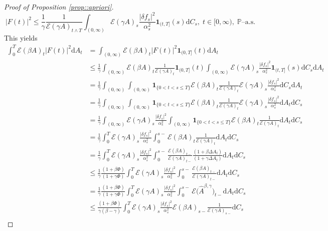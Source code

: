 \documentclass[10pt]{article} %
\newcommand\cE{\mathcal E}
\def \P{\mathbb{P}}
\newcommand{\1}{\mathbf{1}}
\def\d{\mathrm{d}}
\begin{document}
\begin{proof}[Proof of Proposition \ref{prop::apriori}]
\begin{equation}\label{eq::F_t_squared}
	|F(t)|^2 \leq \frac{1}{\gamma} \frac{1}{\cE(\gamma A)_{t \land T}} \int_{(0,\infty)} \cE(\gamma A)_s \frac{|\delta f_s|^2}{\alpha^2_s}  \mathbf{1}_{(t,T]}(s) \d C_s, \; t \in [0,\infty), \; \text{$\P$--a.s.}
\end{equation}
This yields
\begin{align*}
	\int_0^T \cE(\beta A)_t |F(t)|^2 \d A_t 
	&= \int_{(0,\infty)} \cE(\beta A)_t |F(t)|^2 \mathbf{1}_{(0,T]}(t) \d A_t \\ 
	&\leq \frac{1}{\gamma}\int_{(0,\infty)} \cE(\beta A)_{t}  \frac{1}{\cE(\gamma A)_{t}} \mathbf{1}_{(0,T]}(t) \int_{(0,\infty)} \cE(\gamma A)_s \frac{|\delta f_s|^2}{\alpha^2_s} \mathbf{1}_{(t,T]}(s) \d C_s \d A_t \nonumber\\
	&= \frac{1}{\gamma}\int_{(0,\infty)}\int_{(0,\infty)}\mathbf{1}_{\{0<t < s \leq T\}} \cE(\beta A)_{t}  \frac{1}{\cE(\gamma A)_{t}} \cE(\gamma A)_s \frac{|\delta f_s|^2}{\alpha^2_s} \d C_s \d A_t \nonumber\\
	&= \frac{1}{\gamma}\int_{(0,\infty)}\int_{(0,\infty)}\mathbf{1}_{\{0<t < s \leq T\}} \cE(\beta A)_{t}  \frac{1}{\cE(\gamma A)_{t}} \cE(\gamma A)_s \frac{|\delta f_s|^2}{\alpha^2_s} \d A_t \d C_s \nonumber\\
	&= \frac{1}{\gamma}\int_{(0,\infty)} \cE(\gamma A)_s \frac{|\delta f_s|^2}{\alpha^2_s} \int_{(0,\infty)}\mathbf{1}_{\{0<t< s \leq T\}} \cE(\beta A)_{t}  \frac{1}{\cE(\gamma A)_{t}} \d A_t \d C_s \nonumber\\
	&= \frac{1}{\gamma}\int_0^T \cE(\gamma A)_s \frac{|\delta f_s|^2}{\alpha^2_s} \int_0^{s-} \cE(\beta A)_{t}  \frac{1}{\cE(\gamma A)_{t}} \d A_t \d C_s \\
	&=  \frac{1}{\gamma}\int_0^T \cE(\gamma A)_s \frac{|\delta f_s|^2}{\alpha^2_s} \int_0^{s-} \frac{\cE(\beta A)_{t-}}{\cE(\gamma A)_{t-}}\frac{(1+\beta\Delta A_t)}{(1+\gamma\Delta A_t)} \d A_t \d C_s \\
	&\leq  \frac{1}{\gamma}\frac{(1+\beta\Phi)}{(1+\gamma\Phi)} \int_0^T \cE(\gamma A)_s \frac{|\delta f_s|^2}{\alpha^2_s} \int_0^{s-} \frac{\cE(\beta A)_{t-}}{\cE(\gamma A)_{t-}}\d A_t \d C_s \\
	&=  \frac{1}{\gamma}\frac{(1+\beta\Phi)}{(1+\gamma\Phi)}\int_0^T \cE(\gamma A)_s \frac{|\delta f_s|^2}{\alpha^2_s} \int_0^{s-} \cE\big(\widehat A^{\beta,\gamma}\big)_{t-} \d A_t \d C_s \\
	&\leq \frac{(1+\beta\Phi)}{\gamma(\beta - \gamma)}\int_0^T \cE(\gamma A)_s \frac{|\delta f_s|^2}{\alpha^2_s}  \cE(\beta A)_{s-} \frac{1}{\cE(\gamma A)_{s-}} \d C_s \\

\end{align*}
\end{proof}
\end{document}
